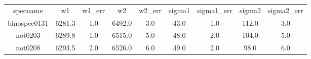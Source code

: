 \begin{table}
\begin{tabular}{ccccccccc}
specname & w1 & w1_err & w2 & w2_err & sigma1 & sigma1_err & sigma2 & sigma2_err \\
binospec0131 & 6281.3 & 1.0 & 6492.0 & 3.0 & 43.0 & 1.0 & 112.0 & 3.0 \\
not0203 & 6289.8 & 1.0 & 6515.0 & 5.0 & 48.0 & 2.0 & 104.0 & 5.0 \\
not0208 & 6293.5 & 2.0 & 6526.0 & 6.0 & 49.0 & 2.0 & 98.0 & 6.0 \\
\end{tabular}
\end{table}
